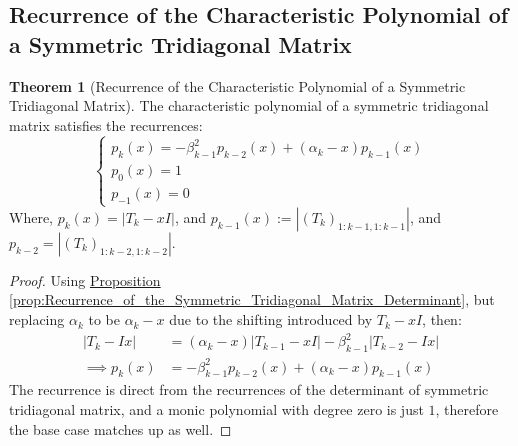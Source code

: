 \documentclass[]{article}
\theoremstyle{definition}
\newtheorem{theorem}{Theorem}            %
\begin{document}
\begin{appendices}
        \subsection{Recurrence of the Characteristic Polynomial of a Symmetric Tridiagonal Matrix}
            \begin{theorem}[Recurrence of the Characteristic Polynomial of a Symmetric Tridiagonal Matrix]
            \label{theorem:Recurrence_of_the_Characteristic_Polynomial_of_a_Symmetric_Tridiagonal_Matrix}
            The characteristic polynomial of a symmetric tridiagonal matrix satisfies the recurrences: 
            $$
            \begin{cases}
                p_k(x) = - \beta_{k - 1}^2 p_{k - 2}(x) + (\alpha_k - x)p_{k - 1}(x)
                \\
                p_0(x) = 1
                \\
                p_{-1}(x) = 0
            \end{cases}
            $$
            Where, $p_k(x) = |T_k - xI|$, and $p_{k - 1}(x) :=|(T_k)_{1:k - 1, 1:k - 1}|$, and $p_{k - 2} = |(T_k)_{1:k - 2, 1:k - 2}|$. 
            \end{theorem}
            \begin{proof}
                Using \hyperref[prop:Recurrence_of_the_Symmetric_Tridiagonal_Matrix_Determinant]{Proposition \ref*{prop:Recurrence_of_the_Symmetric_Tridiagonal_Matrix_Determinant}}, but replacing $\alpha_k$ to be $\alpha_k - x$ due to the shifting introduced by $T_k - xI$, then: 
                \begin{align}
                    |T_k - Ix| &= (\alpha_k - x)|T_{k - 1} - xI| -\beta_{k - 1}^2|T_{k - 2} - Ix|
                    \\
                    \implies
                    p_k(x) &= - \beta_{k - 1}^2 p_{k - 2}(x) + (\alpha_k - x)p_{k - 1}(x)
                \end{align}
                The recurrence is direct from the recurrences of the determinant of symmetric tridiagonal matrix, and a monic polynomial with degree zero is just $1$, therefore the base case matches up as well. 
            \end{proof}

\end{appendices}
\end{document}
